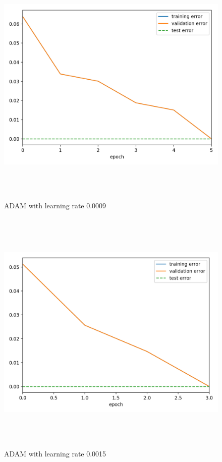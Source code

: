 \documentclass[a4paper]{article}
\begin{document}
\begin{figure}[h]
\caption{ADAM with learning rate 0.0009}
\centering
\includegraphics[width=15cm, height=12cm]{AD_LR0009}
\end{figure}

\begin{figure}[h]
\caption{ADAM with learning rate 0.0015}
\centering
\includegraphics[width=15cm, height=12cm]{AD_LR0015}
\end{figure}
\end{document}
